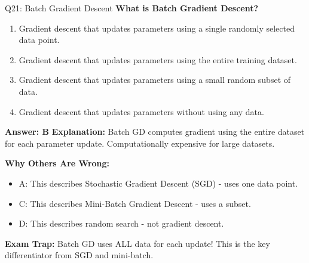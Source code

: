 \documentclass[8pt]{beamer}
\begin{document}
	\begin{frame}{Q21: Batch Gradient Descent}
		\fontsize{6.5}{7.5}\selectfont
		\textbf{What is Batch Gradient Descent?}
		
		\begin{enumerate}
			\item Gradient descent that updates parameters using a single randomly selected data point.
			\item Gradient descent that updates parameters using the entire training dataset.
			\item Gradient descent that updates parameters using a small random subset of data.
			\item Gradient descent that updates parameters without using any data.
		\end{enumerate}
		
		\vspace{0.05cm}
		\textcolor{myblue}{\textbf{Answer: B}}
		\vspace{0.05cm}
		\textcolor{myblue}{\textbf{Explanation:}} Batch GD computes gradient using the entire dataset for each parameter update. Computationally expensive for large datasets.
		
		\vspace{0.05cm}
		\textcolor{myred}{\textbf{Why Others Are Wrong:}}
		\begin{itemize}
			\item \textcolor{myred}{A:} This describes Stochastic Gradient Descent (SGD) - uses one data point.
			\item \textcolor{myred}{C:} This describes Mini-Batch Gradient Descent - uses a subset.
			\item \textcolor{myred}{D:} This describes random search - not gradient descent.
		\end{itemize}
		
		\textcolor{myred}{\textbf{Exam Trap:}} Batch GD uses \textcolor{myblue}{ALL data} for each update! This is the key differentiator from SGD and mini-batch.
	\end{frame}
	
\end{document}
